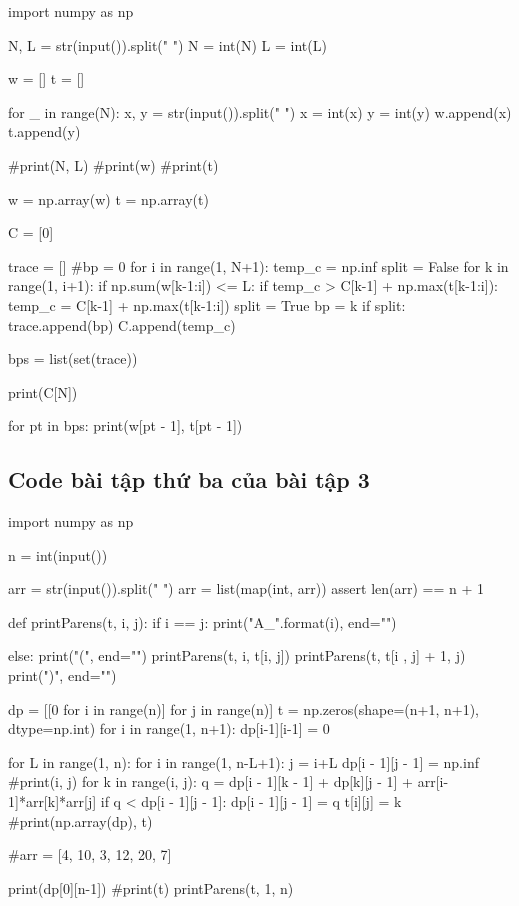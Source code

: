 \documentclass[14pt, a4paper]{article}
\theoremstyle{sltheorem}
\theoremstyle{soltheorem}
\begin{document}
\begin{python}
import numpy as np
            
N, L = str(input()).split(" ")
N = int(N)
L = int(L)
                        
w = []
t = []
                        
for _ in range(N):
    x, y = str(input()).split(" ")
    x = int(x)
    y = int(y)
    w.append(x)
    t.append(y)
                        
#print(N, L)
#print(w)
#print(t)
                        
w = np.array(w)
t = np.array(t)
                        
C = [0]
                        
trace = []
#bp = 0
for i in range(1, N+1):
    temp_c = np.inf
    split = False
    for k in range(1, i+1):
        if np.sum(w[k-1:i]) <= L:
            if temp_c > C[k-1] + np.max(t[k-1:i]):
                temp_c = C[k-1] + np.max(t[k-1:i])
                split = True
                bp = k
    if split:
        trace.append(bp)
    C.append(temp_c)
                        
bps = list(set(trace))
                        
print(C[N])
                        
for pt in bps:
    print(w[pt - 1], t[pt - 1])
\end{python}

\subsection{Code bài tập thứ ba của bài tập 3} \label{code-3-ex-3}

\begin{python}
import numpy as np

n = int(input())
    
arr = str(input()).split(" ")
arr = list(map(int, arr))
assert len(arr) == n + 1
    
def printParens(t, i, j):
    if i == j:
        print("A_{}".format(i), end="")
    
    else:
        print("(", end="")
        printParens(t, i, t[i, j])
        printParens(t, t[i , j] + 1, j)
        print(")", end="")
    
    
dp = [[0 for i in range(n)] for j in range(n)]
t = np.zeros(shape=(n+1, n+1), dtype=np.int)
for i in range(1, n+1):
    dp[i-1][i-1] = 0
        
for L in range(1, n):
    for i in range(1, n-L+1):
        j = i+L
        dp[i - 1][j - 1] = np.inf
        #print(i, j)
        for k in range(i, j):
            q = dp[i - 1][k - 1] + dp[k][j - 1] + arr[i-1]*arr[k]*arr[j]
            if q < dp[i - 1][j - 1]:
                dp[i - 1][j - 1] = q
                t[i][j] = k
#print(np.array(dp), t)
    
#arr = [4, 10, 3, 12, 20, 7]
    
    
print(dp[0][n-1])
#print(t)
printParens(t, 1, n)
\end{python}
\end{document}
